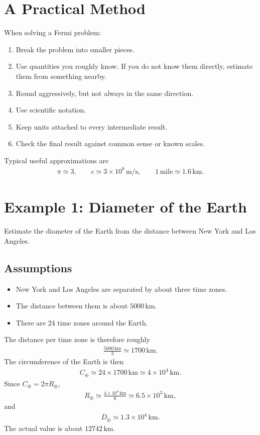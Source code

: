 \documentclass[12pt]{article}
\newcommand{\be}{\begin{eqnarray}}
\newcommand{\ee}{\end{eqnarray}}
\begin{document}
\section{A Practical Method}
When solving a Fermi problem:
\begin{enumerate}
    \item Break the problem into smaller pieces.
    \item Use quantities you roughly know. If you do not know them directly, estimate them from something nearby.
    \item Round aggressively, but not always in the same direction.
    \item Use scientific notation.
    \item Keep units attached to every intermediate result.
    \item Check the final result against common sense or known scales.
\end{enumerate}

Typical useful approximations are
\be
\pi \simeq 3,\qquad c\simeq 3\times 10^8\,\mathrm{m/s},\qquad
1\,\mathrm{mile}\simeq 1.6\,\mathrm{km}.
\ee

\section{Example 1: Diameter of the Earth}
Estimate the diameter of the Earth from the distance between New York and Los Angeles.

\subsection*{Assumptions}
\begin{itemize}
    \item New York and Los Angeles are separated by about three time zones.
    \item The distance between them is about $5000\,\mathrm{km}$.
    \item There are 24 time zones around the Earth.
\end{itemize}

The distance per time zone is therefore roughly
\be
\frac{5000\,\mathrm{km}}{3} \simeq 1700\,\mathrm{km}.
\ee
The circumference of the Earth is then
\be
C_{\oplus} \simeq 24 \times 1700\,\mathrm{km}
\simeq 4\times 10^4\,\mathrm{km}.
\ee
Since $C_{\oplus}=2\pi R_{\oplus}$,
\be
R_{\oplus} \simeq \frac{4\times 10^4\,\mathrm{km}}{6}
\simeq 6.5\times 10^3\,\mathrm{km},
\ee
and
\be
D_{\oplus}\simeq 1.3\times 10^4\,\mathrm{km}.
\ee
The actual value is about $12742\,\mathrm{km}$.
\end{document}

